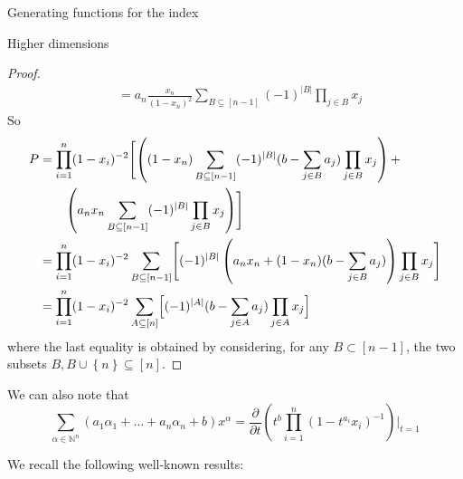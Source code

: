 \documentclass[reqno,a4paper,10pt]{amsart}
\theoremstyle{definition}
\theoremstyle{remark}
\theoremstyle{plain}
\newcommand{\set}[1]{\left\{{#1}\right\}}
\newcommand{\tdeg}[1]{\lvert #1 \rvert}
\newcommand{\Nat}{{\mathbb{N}}}
\begin{document}
\begin{section}{Generating functions for the index}
\begin{subsection}{Higher dimensions}
\begin{proof}
\begin{displaymath}
\begin{split}
        &= a_n \frac{x_n}{(1-x_n)^2} \sum_{B \subseteq [n-1]} (-1)^{\tdeg{B}} 
        \prod_{j \in B} x_j  
       \end{split}
     \end{displaymath}
     So
     \begin{displaymath}
       \begin{split}
        P &= \prod_{i=1}^n (1-x_i)^{-2} \Biggl[ \left(
        (1-x_n) \sum_{B \subseteq 
          [n-1]} (-1)^{\tdeg{B}} (b - \sum_{j \in B}
        a_j) \prod_{j \in B} x_j 
        \right)
        + \\
        & \qquad
        \left(
          a_n x_n \sum_{B \subseteq [n-1]} (-1)^{\tdeg{B}} 
        \prod_{j \in B} x_j
          \right)
        \Biggr] \\
        &= \prod_{i=1}^n (1-x_i)^{-2} 
        \sum_{B \subseteq 
          [n-1]} \Biggl[ (-1)^{\tdeg{B}} \left( a_nx_n + (1-x_n)(b - \sum_{j \in
            B} a_j)\right) \prod_{j \in B} x_j \Biggr] \\
        &=       \prod_{i=1}^n(1-x_i)^{-2} \sum_{A \subseteq [n]} \Bigl[
      (-1)^{\tdeg{A}}(b-\sum_{j \in A} a_j) \prod_{j \in A} x_j \Bigr]         
       \end{split}
     \end{displaymath}
    where the last equality is obtained by considering, for any \(B
    \subset [n-1]\), the two subsets \(B, B \cup \set{n} \subseteq [n]\).
  \end{proof}
  
  We can also note that 
  \begin{equation}
    \label{eq:3}
    \sum_{\alpha \in \Nat^n} (a_1\alpha_1 +\dots + a_n \alpha_n + b)
    x^\alpha =
    \frac{\partial}{\partial t} \left( t^b \prod_{i=1}^n (1-t^{a_i}x_i)^{-1}
    \right) \Biggl \lvert_{t=1} 
  \end{equation}
  
  We  recall the
  following well-known results:  
  

\end{subsection}
\end{section}
\end{document}
